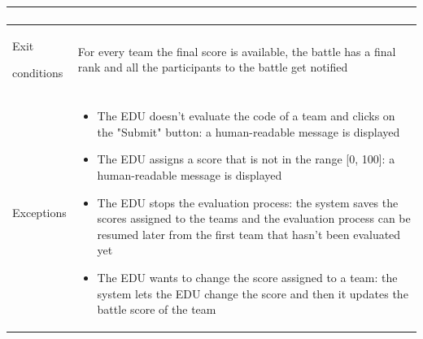 \begin{center}
\begin{tabular}{| m{2cm} | m{10cm}|}
\begin{enumerate}
                                \end{enumerate}                                                                                                                   \\ \hline
        Exit \par conditions  & For every team the final score is available, the battle has a final rank and all the participants to the battle get notified                                                                                             \\ \hline
        Exceptions            & \begin{itemize}
                                    \item The EDU doesn't evaluate the code of a team and clicks on the "Submit" button: a human-readable message is displayed
                                    \item The EDU assigns a score that is not in the range [0, 100]: a human-readable message is displayed
                                    \item The EDU stops the evaluation process: the system saves the scores assigned to the teams and the evaluation process can be resumed later from the first team that hasn't been evaluated yet
                                    \item The EDU wants to change the score assigned to a team: the system lets the EDU change the score and then it updates the battle score of the team
                                \end{itemize}                          \\ \hline
    \end{tabular}
\end{center}

